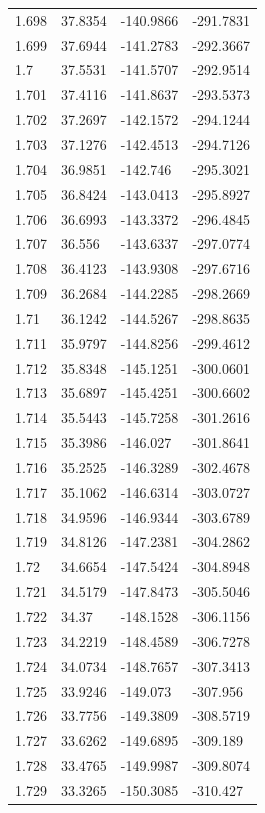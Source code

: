 \begin{tabular}{llll}
1.698 & 37.8354 & -140.9866 & -291.7831 \\
1.699 & 37.6944 & -141.2783 & -292.3667 \\
1.7 & 37.5531 & -141.5707 & -292.9514 \\
1.701 & 37.4116 & -141.8637 & -293.5373 \\
1.702 & 37.2697 & -142.1572 & -294.1244 \\
1.703 & 37.1276 & -142.4513 & -294.7126 \\
1.704 & 36.9851 & -142.746 & -295.3021 \\
1.705 & 36.8424 & -143.0413 & -295.8927 \\
1.706 & 36.6993 & -143.3372 & -296.4845 \\
1.707 & 36.556 & -143.6337 & -297.0774 \\
1.708 & 36.4123 & -143.9308 & -297.6716 \\
1.709 & 36.2684 & -144.2285 & -298.2669 \\
1.71 & 36.1242 & -144.5267 & -298.8635 \\
1.711 & 35.9797 & -144.8256 & -299.4612 \\
1.712 & 35.8348 & -145.1251 & -300.0601 \\
1.713 & 35.6897 & -145.4251 & -300.6602 \\
1.714 & 35.5443 & -145.7258 & -301.2616 \\
1.715 & 35.3986 & -146.027 & -301.8641 \\
1.716 & 35.2525 & -146.3289 & -302.4678 \\
1.717 & 35.1062 & -146.6314 & -303.0727 \\
1.718 & 34.9596 & -146.9344 & -303.6789 \\
1.719 & 34.8126 & -147.2381 & -304.2862 \\
1.72 & 34.6654 & -147.5424 & -304.8948 \\
1.721 & 34.5179 & -147.8473 & -305.5046 \\
1.722 & 34.37 & -148.1528 & -306.1156 \\
1.723 & 34.2219 & -148.4589 & -306.7278 \\
1.724 & 34.0734 & -148.7657 & -307.3413 \\
1.725 & 33.9246 & -149.073 & -307.956 \\
1.726 & 33.7756 & -149.3809 & -308.5719 \\
1.727 & 33.6262 & -149.6895 & -309.189 \\
1.728 & 33.4765 & -149.9987 & -309.8074 \\
1.729 & 33.3265 & -150.3085 & -310.427 \\

\end{tabular}
